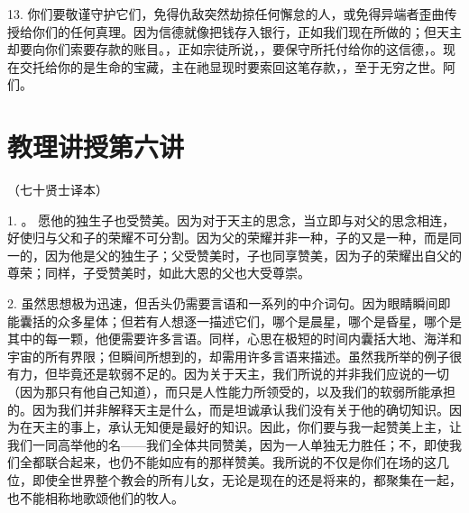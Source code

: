 13. 你们要敬谨守护它们，免得仇敌突然劫掠任何懈怠的人，或免得异端者歪曲传授给你们的任何真理。因为信德就像把钱存入银行，正如我们现在所做的；但天主却要向你们索要存款的账目。，正如宗徒所说，，要保守所托付给你的这信德，。现在交托给你的是生命的宝藏，主在祂显现时要索回这笔存款，，至于无穷之世。阿们。\par



\section{教理讲授第六讲}

\par

（七十贤士译本）\par

\par

1. 。 愿他的独生子也受赞美。因为对于天主的思念，当立即与对父的思念相连，好使归与父和子的荣耀不可分割。因为父的荣耀并非一种，子的又是一种，而是同一的，因为他是父的独生子；父受赞美时，子也同享赞美，因为子的荣耀出自父的尊荣；同样，子受赞美时，如此大恩的父也大受尊崇。\par

2. 虽然思想极为迅速，但舌头仍需要言语和一系列的中介词句。因为眼睛瞬间即能囊括的众多星体；但若有人想逐一描述它们，哪个是晨星，哪个是昏星，哪个是其中的每一颗，他便需要许多言语。同样，心思在极短的时间内囊括大地、海洋和宇宙的所有界限；但瞬间所想到的，却需用许多言语来描述。虽然我所举的例子很有力，但毕竟还是软弱不足的。因为关于天主，我们所说的并非我们应说的一切（因为那只有他自己知道），而只是人性能力所领受的，以及我们的软弱所能承担的。因为我们并非解释天主是什么，而是坦诚承认我们没有关于他的确切知识。因为在天主的事上，承认无知便是最好的知识。因此，你们要与我一起赞美上主，让我们一同高举他的名——我们全体共同赞美，因为一人单独无力胜任；不，即使我们全都联合起来，也仍不能如应有的那样赞美。我所说的不仅是你们在场的这几位，即使全世界整个教会的所有儿女，无论是现在的还是将来的，都聚集在一起，也不能相称地歌颂他们的牧人。\par

